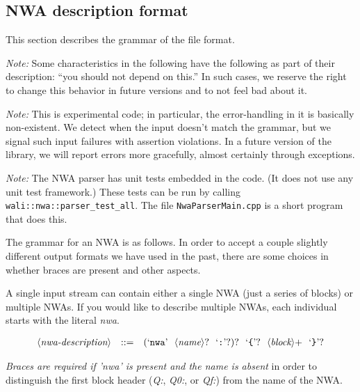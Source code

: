 \subsection{NWA description format}
\label{Se:nwa-grammar}

This section describes the grammar of the file format.

\textsl{Note:} Some characteristics in the following have the
following as part of their description: ``you should not depend on
this.'' In such cases, we reserve the right to change this behavior in
future versions and to not feel bad about it.

\textsl{Note:} This is experimental code; in particular, the
error-handling in it is basically non-existent. We detect when the
input doesn't match the grammar, but we signal such input failures
with assertion violations. In a future version of the library, we will
report errors more gracefully, almost certainly through exceptions.

\textsl{Note:} The NWA parser has unit tests embedded in the code. (It
does not use any unit test framework.) These tests can be run by
calling \texttt{wali::nwa::parser\_test\_all}. The file
\texttt{NwaParserMain.cpp} is a short program that does this.


The grammar for an NWA is as follows. In order to accept a couple
slightly different output formats we have used in the past, there are
some choices in whether braces are present and other aspects.


A single input stream can contain either a single NWA (just a series
of blocks) or multiple NWAs. If you would like to describe multiple
NWAs, each individual starts with the literal \textsl{nwa}.

\newenvironment{grammar}{\begin{equation*}\begin{array}{lrl}}{\end{array}\end{equation*}}
\newcommand{\nonterm}[1]{\ensuremath{\langle}\textit{#1}\ensuremath{\rangle}}
\newcommand{\term}[1]{\textrm`\texttt{#1}\textrm'}
\newcommand{\cfgsp}{\ \ }

\begin{grammar}
  \nonterm{nwa-description} & ::= & \left(\term{nwa}\cfgsp\nonterm{name}?\cfgsp\term{:}?\right)?\cfgsp\term{\{}?\cfgsp\nonterm{block}{+}\cfgsp\term{\}}?
\end{grammar}

\textsl{Braces are required if 'nwa' is present and the name is absent}
 in order to
 distinguish the first block header (\textsl{Q:}, \textsl{Q0:},
 or \textsl{Qf:}) from the name of the NWA.

